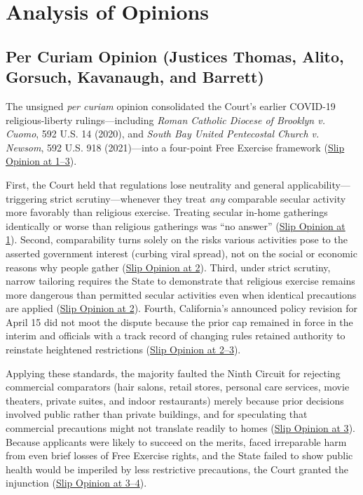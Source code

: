 \documentclass[12pt]{article}
\begin{document}
\section{Analysis of Opinions}

\subsection{Per Curiam Opinion (Justices Thomas, Alito, Gorsuch, Kavanaugh, and Barrett)}
The unsigned \textit{per curiam} opinion consolidated the Court's earlier COVID-19 religious-liberty rulings---including \textit{Roman Catholic Diocese of Brooklyn v. Cuomo}, 592 U.S. 14 (2020), and \textit{South Bay United Pentecostal Church v. Newsom}, 592 U.S. 918 (2021)---into a four-point Free Exercise framework (\href{https://www.supremecourt.gov/opinions/20pdf/20a151_4g15.pdf}{Slip Opinion at 1--3}).

First, the Court held that regulations lose neutrality and general applicability---triggering strict scrutiny---whenever they treat \textit{any} comparable secular activity more favorably than religious exercise. Treating secular in-home gatherings identically or worse than religious gatherings was ``no answer'' (\href{https://www.supremecourt.gov/opinions/20pdf/20a151_4g15.pdf}{Slip Opinion at 1}). Second, comparability turns solely on the risks various activities pose to the asserted government interest (curbing viral spread), not on the social or economic reasons why people gather (\href{https://www.supremecourt.gov/opinions/20pdf/20a151_4g15.pdf}{Slip Opinion at 2}). Third, under strict scrutiny, narrow tailoring requires the State to demonstrate that religious exercise remains more dangerous than permitted secular activities even when identical precautions are applied (\href{https://www.supremecourt.gov/opinions/20pdf/20a151_4g15.pdf}{Slip Opinion at 2}). Fourth, California's announced policy revision for April 15 did not moot the dispute because the prior cap remained in force in the interim and officials with a track record of changing rules retained authority to reinstate heightened restrictions (\href{https://www.supremecourt.gov/opinions/20pdf/20a151_4g15.pdf}{Slip Opinion at 2--3}).

Applying these standards, the majority faulted the Ninth Circuit for rejecting commercial comparators (hair salons, retail stores, personal care services, movie theaters, private suites, and indoor restaurants) merely because prior decisions involved public rather than private buildings, and for speculating that commercial precautions might not translate readily to homes (\href{https://www.supremecourt.gov/opinions/20pdf/20a151_4g15.pdf}{Slip Opinion at 3}). Because applicants were likely to succeed on the merits, faced irreparable harm from even brief losses of Free Exercise rights, and the State failed to show public health would be imperiled by less restrictive precautions, the Court granted the injunction (\href{https://www.supremecourt.gov/opinions/20pdf/20a151_4g15.pdf}{Slip Opinion at 3--4}).
\end{document}
